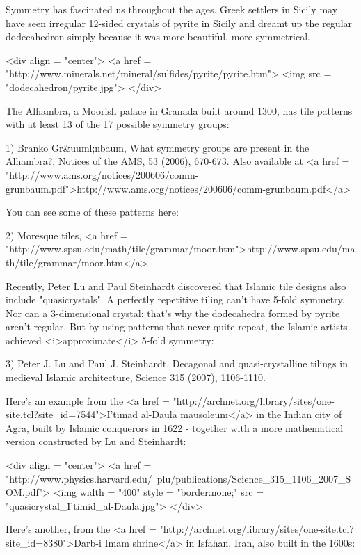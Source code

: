 

Symmetry has fascinated us throughout the ages.  Greek settlers 
in Sicily may have seen irregular 12-sided crystals of pyrite in Sicily
and dreamt up the regular dodecahedron simply because it was more 
beautiful, more symmetrical. 

<div align = "center">
<a href = "http://www.minerals.net/mineral/sulfides/pyrite/pyrite.htm">
<img src = "dodecahedron/pyrite.jpg">
</div>

The Alhambra, a Moorish palace in Granada
built around 1300, has tile patterns with at least 13 of the 17 possible 
symmetry groups:

1) Branko Gr&uuml;nbaum, What symmetry groups are present in the 
Alhambra?, Notices of the AMS, 53 (2006),
670-673.  Also available at <a href = "http://www.ams.org/notices/200606/comm-grunbaum.pdf">http://www.ams.org/notices/200606/comm-grunbaum.pdf</a>

You can see some of these patterns here:

2) Moresque tiles, <a href = "http://www.spsu.edu/math/tile/grammar/moor.htm">http://www.spsu.edu/math/tile/grammar/moor.htm</a>

Recently, Peter Lu and Paul Steinhardt discovered that Islamic tile 
designs also include "quasicrystals".  A perfectly repetitive tiling
can't have 5-fold symmetry.  Nor can a 3-dimensional crystal: that's why
the dodecahedra formed by pyrite aren't regular.  But by using 
patterns that never quite repeat, the Islamic artists
achieved <i>approximate</i> 5-fold symmetry:

3) Peter J. Lu and Paul J. Steinhardt, Decagonal and quasi-crystalline
tilings in medieval Islamic architecture, Science 315 (2007),
1106-1110.  

Here's an example from the <a href = "http://archnet.org/library/sites/one-site.tcl?site_id=7544">I'timad al-Daula mausoleum</a> in the Indian city of
Agra, built by Islamic conquerors in 1622 - together with a more 
mathematical version constructed by Lu and Steinhardt:

<div align = "center">
<a href = "http://www.physics.harvard.edu/~plu/publications/Science_315_1106_2007_SOM.pdf">
<img width = "400" style = "border:none;" src = "quasicrystal_I'timid_al-Daula.jpg">
</div>

Here's another, from the 
<a href = "http://archnet.org/library/sites/one-site.tcl?site_id=8380">Darb-i Imam shrine</a>
in Isfahan, Iran, also built 
in the 1600s:

